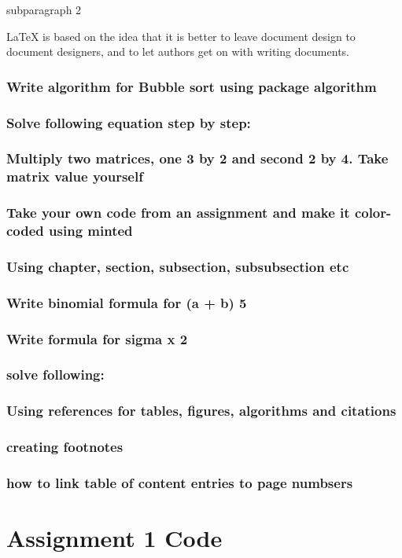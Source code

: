 \documentclass{report}
\begin{document}
    \subparagraph{subparagraph 2}
    LaTeX is based on the idea that it is better to leave document design to document designers, and to let authors get on with writing documents.
    \section{Write algorithm for Bubble sort using package algorithm}
    \section{Solve following equation step by step:}
    \section{Multiply two matrices, one 3 by 2 and second 2 by 4. Take matrix value
    yourself}
    \section{Take your own code from an assignment and make it color-coded using
    minted}
    \section{Using chapter, section, subsection, subsubsection etc}
    \section{Write binomial formula for (a + b) 5}
    \section{Write formula for sigma x 2 }
    \section{solve following:}
    \section{Using references for tables, figures, algorithms and citations}
    \section{creating footnotes}
    \section{how to link table of content entries to page numbsers}

    

    \part{Assignment 1 Code}


    
\end{document}
